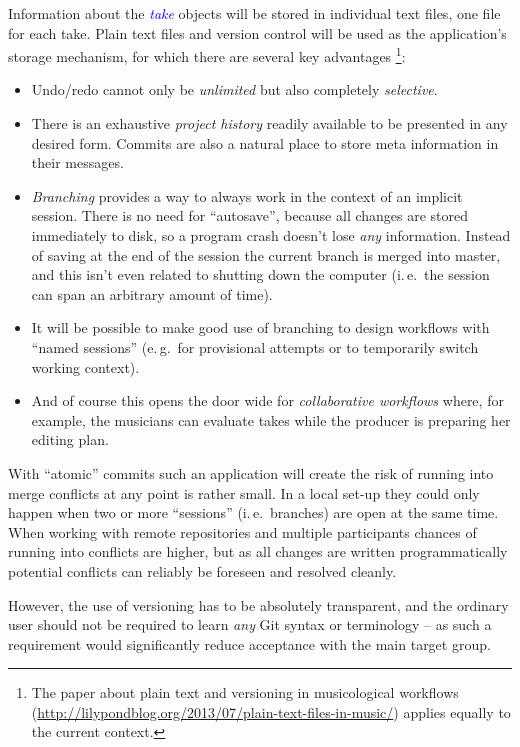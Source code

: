 \documentclass[11pt,a4paper]{article}
\newcommand*{\term}[1]{\textcolor{blue}{\emph{#1}}}
\begin{document}
Information about the \term{take} objects will be stored in individual
text files, one file for each take. Plain text files and version control 
will be used as the application's storage mechanism, for which there are
several key advantages%
\footnote{The paper about plain text and versioning in musicological workflows
(\url{http://lilypondblog.org/2013/07/plain-text-files-in-music/}) applies
equally to the current context.}:
\begin{itemize}
\item Undo/redo cannot only be \emph{unlimited} but also completely
\emph{selective}.
\item There is an exhaustive \emph{project history} readily available to be
presented in any desired form.
Commits are also a natural place to store meta information in their messages.
\item \emph{Branching} provides a way to always work in the context of an
implicit session.
There is no need for “autosave”, because all changes are stored immediately to
disk, so a program crash doesn't lose \emph{any} information.
Instead of saving at the end of the session the current branch is merged into
master, and this isn't even related to shutting down the computer (i.\,e.\ the session can span an arbitrary amount of time).
\item It will be possible to make good use of branching to design workflows with
“named sessions” (e.\,g.\ for provisional attempts or to temporarily switch working context).
\item And of course this opens the door wide for \emph{collaborative
workflows} where, for example, the musicians can evaluate takes while the producer
is preparing her editing plan.
\end{itemize}

With “atomic” commits such an application will create the risk of running into merge conflicts at any point is rather small.
In a local set-up they could only happen when two or more “sessions” (i.\,e.\
branches) are open at the same time.
When working with remote repositories and multiple participants chances of
running into conflicts are higher, but as all changes are written
programmatically potential conflicts can reliably be foreseen and resolved cleanly.

However, the use of versioning has to be absolutely transparent, and the ordinary user should not be required to learn \emph{any} Git syntax or terminology -- as
such a requirement would significantly reduce acceptance with the main target
group.
\end{document}
